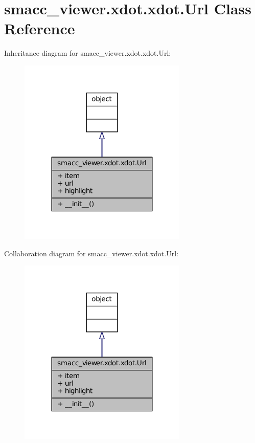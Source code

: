 \hypertarget{classsmacc__viewer_1_1xdot_1_1xdot_1_1Url}{}\section{smacc\+\_\+viewer.\+xdot.\+xdot.\+Url Class Reference}
\label{classsmacc__viewer_1_1xdot_1_1xdot_1_1Url}


Inheritance diagram for smacc\+\_\+viewer.\+xdot.\+xdot.\+Url\+:
\nopagebreak
\begin{figure}[H]
\begin{center}
\leavevmode
\includegraphics[width=227pt]{classsmacc__viewer_1_1xdot_1_1xdot_1_1Url__inherit__graph}
\end{center}
\end{figure}


Collaboration diagram for smacc\+\_\+viewer.\+xdot.\+xdot.\+Url\+:
\nopagebreak
\begin{figure}[H]
\begin{center}
\leavevmode
\includegraphics[width=227pt]{classsmacc__viewer_1_1xdot_1_1xdot_1_1Url__coll__graph}
\end{center}
\end{figure}
